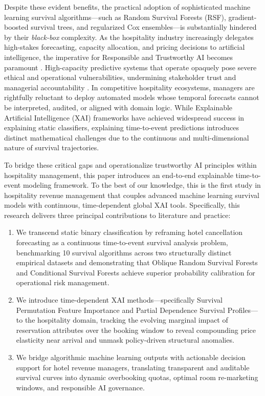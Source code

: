 \documentclass[pdflatex,sn-mathphys-ay]{sn-jnl}
\theoremstyle{thmstyleone}%
\theoremstyle{thmstyletwo}%
\theoremstyle{thmstylethree}%
\begin{document}
Despite these evident benefits, the practical adoption of sophisticated machine learning survival algorithms—such as Random Survival Forests (RSF), gradient-boosted survival trees, and regularized Cox ensembles—is substantially hindered by their \textit{black-box} complexity. As the hospitality industry increasingly delegates high-stakes forecasting, capacity allocation, and pricing decisions to artificial intelligence, the imperative for Responsible and Trustworthy AI becomes paramount \citep{khan2025artificial}. High-capacity predictive systems that operate opaquely pose severe ethical and operational vulnerabilities, undermining stakeholder trust and managerial accountability \citep{thiebes2021trustworthy, meske2022explainable}. In competitive hospitality ecosystems, managers are rightfully reluctant to deploy automated models whose temporal forecasts cannot be interpreted, audited, or aligned with domain logic. While Explainable Artificial Intelligence (XAI) frameworks have achieved widespread success in explaining static classifiers, explaining time-to-event predictions introduces distinct mathematical challenges due to the continuous and multi-dimensional nature of survival trajectories.

To bridge these critical gaps and operationalize trustworthy AI principles within hospitality management, this paper introduces an end-to-end explainable time-to-event modeling framework. To the best of our knowledge, this is the first study in hospitality revenue management that couples advanced machine learning survival models with continuous, time-dependent global XAI tools. Specifically, this research delivers three principal contributions to literature and practice:
\begin{enumerate}
\item We transcend static binary classification by reframing hotel cancellation forecasting as a continuous time-to-event survival analysis problem, benchmarking 10 survival algorithms across two structurally distinct empirical datasets and demonstrating that Oblique Random Survival Forests and Conditional Survival Forests achieve superior probability calibration for operational risk management.
\item We introduce time-dependent XAI methods—specifically Survival Permutation Feature Importance and Partial Dependence Survival Profiles—to the hospitality domain, tracking the evolving marginal impact of reservation attributes over the booking window to reveal compounding price elasticity near arrival and unmask policy-driven structural anomalies.
\item We bridge algorithmic machine learning outputs with actionable decision support for hotel revenue managers, translating transparent and auditable survival curves into dynamic overbooking quotas, optimal room re-marketing windows, and responsible AI governance.
\end{enumerate}
\end{document}

